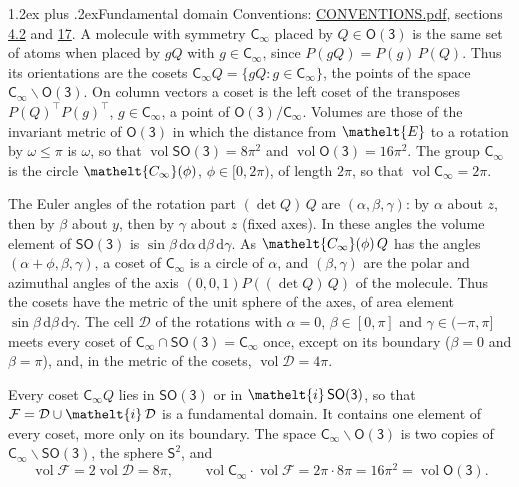 \documentclass[10pt,a4paper]{article}
\makeatletter
\renewcommand\section{\@startsection{section}{1}{\z@}{-3ex plus -1ex minus -.2ex}%
  {1.2ex plus .2ex}{\normalfont\large\sffamily\bfseries\color{parttitle}}}
\numberwithin{equation}{section}
\newcommand{\eltfont}[1]{{\let\sigma\eltsigma\mathelt{#1}}}
\newcommand{\grp}[1]{\mathsf{#1}}
\newcommand{\elt}[1]{\eltfont{#1}}
\newcommand{\dirvec}[3]{(#1, #2, #3)}
\newcommand{\diff}{\mathrm{d}}
\newcommand{\vol}{\operatorname{vol}}
\newcommand{\fcell}{\mathcal{D}}
\newcommand{\fdomain}{\mathcal{F}}
\newcommand{\twosphere}{\mathsf{S}^{2}}
\makeatother
\begin{document}
\section{Fundamental domain}\label{s:fundamental_domain}
Conventions: \href{../../CONVENTIONS.pdf}{CONVENTIONS.pdf}, sections \href{../../CONVENTIONS.pdf\#conv.4.2}{4.2} and \href{../../CONVENTIONS.pdf\#conv.17}{17}.
\leavevmode\label{n:element.placement}A molecule with symmetry $\grp{C_{\infty}}$ placed by $Q \in \grp{O(3)}$ is the same set of atoms when placed by $gQ$ with $g \in \grp{C_{\infty}}$, since $P(gQ) = P(g)\,P(Q)$. \label{n:operator.cosets}Thus its orientations are the cosets $\grp{C_{\infty}}Q = \{gQ : g \in \grp{C_{\infty}}\}$, the points of the space $\grp{C_{\infty}}\backslash\grp{O(3)}$. On column vectors a coset is the left coset of the transposes $P(Q)^{\top}P(g)^{\top}$, $g \in \grp{C_{\infty}}$, a point of $\grp{O(3)}/\grp{C_{\infty}}$.
\leavevmode\label{n:operator.volume}Volumes are those of the invariant metric of \href{O3.pdf}{$\grp{O(3)}$} in which the distance from $\elt{E}$ to a rotation by $\omega \le \pi$ is $\omega$, so that $\vol\grp{SO(3)} = 8\pi^2$ and $\vol\grp{O(3)} = 16\pi^2$. The group $\grp{C_{\infty}}$ is the circle $\elt{C_{\infty}}(\phi)$, $\phi \in [0, 2\pi)$, of length $2\pi$, so that $\vol\grp{C_{\infty}} = 2\pi$.

\leavevmode\label{n:angle.euler.alpha}\label{n:angle.euler.beta}\label{n:angle.euler.gamma}The Euler angles of the rotation part $(\det Q)\,Q$ are $(\alpha,\beta,\gamma)$: by $\alpha$ about $z$, then by $\beta$ about $y$, then by $\gamma$ about $z$ (fixed axes). In these angles the volume element of \href{SO3.pdf}{$\grp{SO(3)}$} is $\sin\beta\,\diff\alpha\,\diff\beta\,\diff\gamma$. As $\elt{C_{\infty}}(\phi)\,Q$ has the angles $(\alpha + \phi, \beta, \gamma)$, a coset of $\grp{C_{\infty}}$ is a circle of $\alpha$, and $(\beta, \gamma)$ are the polar and azimuthal angles of the axis $\dirvec{0}{0}{1}P((\det Q)\,Q)$ of the molecule. Thus the cosets have the metric of the unit sphere of the axes, of area element $\sin\beta\,\diff\beta\,\diff\gamma$.
\leavevmode\label{n:set.cell}The cell $\fcell$ of the rotations with $\alpha = 0$, $\beta \in [0, \pi]$ and $\gamma \in (-\pi, \pi]$ meets every coset of $\grp{C_{\infty}} \cap \grp{SO(3)} = \grp{C_{\infty}}$ once, except on its boundary ($\beta = 0$ and $\beta = \pi$), and, in the metric of the cosets, $\vol\fcell = 4\pi$.

\leavevmode\label{n:set.fundamental}Every coset $\grp{C_{\infty}}Q$ lies in \href{SO3.pdf}{$\grp{SO(3)}$} or in $\elt{i}\,\grp{SO(3)}$, so that $\fdomain = \fcell \cup \elt{i}\,\fcell$ is a fundamental domain. It contains one element of every coset, more only on its boundary.
\leavevmode\label{n:set.sphere}The space $\grp{C_{\infty}}\backslash\grp{O(3)}$ is two copies of $\grp{C_{\infty}}\backslash\grp{SO(3)}$, the sphere $\twosphere$, and
\begin{equation}\label{e:volume}\vol\fdomain = 2\vol\fcell = 8\pi,\qquad \vol\grp{C_{\infty}}\cdot\vol\fdomain = 2\pi\cdot 8\pi = 16\pi^2 = \vol\grp{O(3)}.\end{equation}
\end{document}
